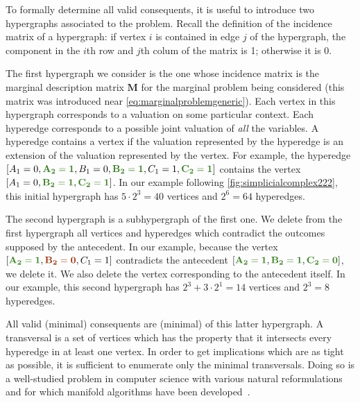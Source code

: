 \documentclass[aps,english,10pt,superscriptaddress,onecolumn,twoside,longbibliography,pra,floatfix,fleqn,nofootinbib]{revtex4-1}%
\newcommand*{\mred}[1]{{\color{RawSienna}{\mathbf{#1}}}}
\newcommand*{\mgreen}[1]{{\color{OliveGreen}{\mathbf{#1}}}}
\newcommand*{\tblue}[1]{{\color{MidnightBlue}{\textbf{#1}}}}
\theoremstyle{definition}
\newcounter{example}[section]
\newcommand{\eql}{=}
\DeclarePairedDelimiter{\bracks}{\lbrack}{\rbrack}
\begin{document}
To formally determine all valid consequents, it is useful to introduce two hypergraphs associated to the problem.  Recall the definition of the incidence  matrix of a hypergraph: if vertex $i$ is contained in edge $j$ of the hypergraph, the component in the $i$th row and $j$th colum of the matrix  is 1; otherwise it is 0.  

The first hypergraph we consider is the one whose incidence matrix is the marginal description matrix $\bm{M}$ for the marginal problem being considered (this matrix was introduced near \cref{eq:marginalproblemgeneric}). 
Each vertex in this hypergraph corresponds to a valuation on some particular context. Each hyperedge corresponds to a possible joint valuation of \emph{all} the variables. A hyperedge contains a vertex if the valuation represented by the hyperedge is an extension of the valuation represented by the vertex. For example, the hyperedge $\bracks{A_1 \eql 0, \mgreen{A_2 \eql 1}, B_1 \eql 0, \mgreen{B_2 \eql 1}, C_1 \eql 1, \mgreen{C_2 \eql 1}}$ contains the vertex $\bracks{A_1 \eql 0,  \mgreen{B_2 \eql 1}, \mgreen{C_2 \eql 1}}$. In our example following \cref{fig:simplicialcomplex222}, this initial hypergraph has $5\cdot 2^3 = 40$ vertices and $2^6 = 64$ hyperedges. 

The second hypergraph is a subhypergraph of the first one. We delete from the first hypergraph all vertices and hyperedges which contradict the outcomes supposed by the antecedent. In our example, because the vertex $\bracks{\mgreen{A_2 \eql 1}, \mred{B_2 \eql 0}, C_1 \eql 1}$ contradicts the antecedent $\bracks{\mgreen{A_2 \eql 1}, \mgreen{B_2 \eql 1}, \mgreen{C_2 \eql 0}}$, we delete it. We also delete the vertex corresponding to the antecedent itself. In our example, this second hypergraph has $2^3 + 3\cdot 2^1 = 14$ vertices and $2^3 = 8$ hyperedges.

All valid (minimal) consequents are (minimal) \tblue{transversals} of this latter hypergraph. A transversal is a set of vertices which has the property that it intersects every hyperedge in at least one vertex. In order to get implications which are as tight as possible, it is sufficient to enumerate only the minimal transversals. Doing so is a well-studied problem in computer science with various natural reformulations and for which manifold algorithms have been developed~\cite{eiter_dualization_2008}.
\end{document}

